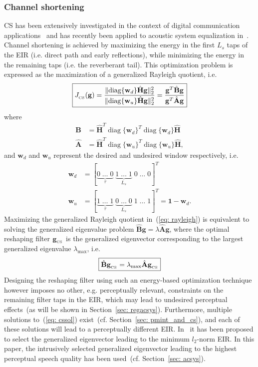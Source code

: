 \documentclass[10pt]{IEEEtran}
\DeclareMathOperator{\diag}{diag}
\begin{document}
\subsubsection*{Channel shortening~\cite{Kallinger_ICASSP_2006}}
CS has been extensively investigated in the context of digital communication applications~\cite{Martin_ITSP_2005} and has recently been applied to acoustic system equalization in~\cite{Kallinger_ICASSP_2006, Zhang_IWAENC_2010}.
Channel shortening is achieved by maximizing the energy in the first $L_s$ taps of the EIR (i.e. direct path and early reflections), while minimizing the energy in the remaining taps (i.e. the reverberant tail).
This optimization problem is expressed as the maximization of a generalized Rayleigh quotient, i.e.
\begin{equation}
\label{eq: rayleigh}
\boxed{J_{_{\rm CS}} (\mathbf{g}) =  \frac{\|{\diag}\{\mathbf{w}_d\}\hat{\mathbf{H}}\mathbf{g}\|_2^2}{\|{\diag}\{\mathbf{w}_u\}\hat{\mathbf{H}}\mathbf{g}\|_2^2} = \frac{\mathbf{g}^T \hat{\mathbf{B}} \mathbf{g}}{\mathbf{g}^T \hat{\mathbf{A}} \mathbf{g}}}
\end{equation}
where
\begin{align}
\hat{\mathbf{B}} & = \hat{\mathbf{H}}^{T} {\diag}\{\mathbf{w}_d \}^T{\diag}\{\mathbf{w}_d \}\hat{\mathbf{H}}  \\
\hat{\mathbf{A}} & = \hat{\mathbf{H}}^{T} {\diag}\{\mathbf{w}_u \}^T{\diag}\{\mathbf{w}_u \}\hat{\mathbf{H}},
\end{align}
and $\mathbf{w}_d$ and $\mathbf{w}_u$ represent the desired and undesired window respectively, i.e.
\begin{align}
\label{eq: wincs}
\mathbf{w}_d & = [\underbrace{0 \; \ldots \; 0}_{\tau} \; \underbrace{1 \; \ldots \; 1}_{L_s}\; 0\; \ldots\; 0]^{T}  \\
\mathbf{w}_u & = [\underbrace{1 \; \ldots \; 1}_{\tau} \; \underbrace{0 \; \ldots \; 0}_{L_s}\; 1\; \ldots\; 1]^{T} = \mathbf{1} - \mathbf{w}_d.
\end{align}
Maximizing the generalized Rayleigh quotient in~(\ref{eq: rayleigh}) is equivalent to solving the generalized eigenvalue problem $\hat{\mathbf{B}} \mathbf{g} = \lambda \hat{\mathbf{A}} \mathbf{g}$, where the optimal reshaping filter $\mathbf{g}_{_{\rm CS}}$ is the generalized eigenvector corresponding to the largest generalized eigenvalue $\lambda_{\max}$, i.e.
\begin{equation}
\label{eq: cssol}
\boxed{\hat{\mathbf{B}} \mathbf{g}_{_{\rm CS}} = \lambda_{\max} \hat{\mathbf{A}}\mathbf{g}_{_{\rm CS}}}
\end{equation}
Designing the reshaping filter using such an energy-based optimization technique however imposes no other, e.g. perceptually relevant, constraints on the remaining filter taps in the EIR, which may lead to undesired perceptual effects~(as will be shown in Section~\ref{sec: regacsys}).
Furthermore, multiple solutions to~(\ref{eq: cssol}) exist~(cf. Section~\ref{sec: pmint_and_cs}), and each of these solutions will lead to a perceptually different EIR.
In~\cite{Zhang_IWAENC_2010} it has been proposed to select the generalized eigenvector leading to the minimum $l_2$-norm EIR.
In this paper, the intrusively selected generalized eigenvector leading to the highest perceptual speech quality has been used~(cf. Section~\ref{sec: acsys}).
\end{document}
